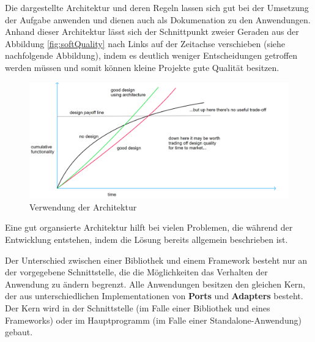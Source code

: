 Die dargestellte Architektur und deren Regeln lassen sich gut bei der Umsetzung der Aufgabe anwenden 
und dienen auch als Dokumenation zu den Anwendungen. Anhand dieser Architektur lässt sich der Schnittpunkt zweier Geraden 
aus der Abbildung \ref{fig:softQuality} nach Links auf der Zeitachse verschieben (siehe nachfolgende Abbildung),
indem es deutlich weniger Entscheidungen getroffen werden müssen und somit können kleine Projekte 
gute Qualität besitzen.

\begin{figure}[H]
    \centering
    \includegraphics[width=1\textwidth]{./images/QASoftwareCompareWithFramework.png}
    \caption[Verwendung der Architektur]{Verwendung der Architektur}
    \label{fig:softQualityWithFramework}
\end{figure} 

Eine gut organsierte Architektur hilft bei vielen Problemen, die während der Entwicklung entstehen, 
indem die Lösung bereits allgemein beschrieben ist. 

Der Unterschied zwischen einer Bibliothek und einem Framework besteht nur an der vorgegebene Schnittstelle, 
die die Möglichkeiten das Verhalten der Anwendung zu ändern begrenzt. 
Alle Anwendungen besitzen den gleichen Kern, der aus unterschiedlichen Implementationen von \textbf{Ports} und \textbf{Adapters} besteht.
Der Kern wird in der Schnittstelle (im Falle einer Bibliothek und eines Frameworks) oder im Hauptprogramm (im Falle einer Standalone-Anwendung) gebaut.


